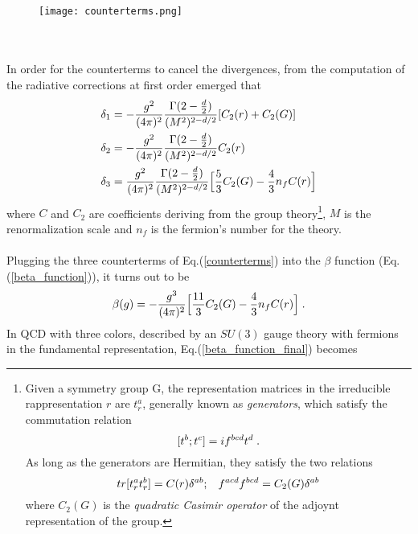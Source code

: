 \\\\
\phantom{i}
\begin{figure*}[h]
\centering
\texttt{[image: counterterms.png]}
\end{figure*}
\phantom{i}
\\\\
In order for the counterterms to cancel the divergences, from the computation of the radiative corrections at first order emerged that
\begin{align}
\begin{split}
\delta_1 &= - \frac{g^2}{(4\pi)^2}\frac{\Gamma(2-\frac{d}{2})}{(M^2)^{2-d/2}}[C_2(r)+C_2(G)] \\
\delta_2 &= - \frac{g^2}{(4\pi)^2}\frac{\Gamma(2-\frac{d}{2})}{(M^2)^{2-d/2}}C_2(r) \\
\delta_3 &= \frac{g^2}{(4\pi)^2}\frac{\Gamma(2-\frac{d}{2})}{(M^2)^{2-d/2}}\Bigl[\frac{5}{3}C_2(G)-\frac{4}{3}n_fC(r)\Bigr]
\end{split}
\label{counterterms}
\end{align}
where $C$ and $C_2$ are coefficients deriving from the group theory\footnote{Given a symmetry group G, the representation matrices in the irreducible rappresentation $r$ are $t_r^a$, generally known as \emph{generators}, which satisfy the commutation relation 
\begin{equation*}
\centering
[t^b;t^c]=if^{bcd}t^d \;.
\end{equation*}
As long as the generators are Hermitian, they satisfy the two relations
\begin{equation*}
tr[t_r^at_r^b] = C(r)\delta^{ab}; \hspace{0.3cm} f^{acd}f^{bcd} = C_2(G)\delta^{ab}
\end{equation*}
where $C_2(G)$ is the \emph{quadratic Casimir operator} of the adjoynt representation of the group.}, $M$ is the renormalization scale and $n_f$ is the fermion's number for the theory.
\\\\
Plugging the three counterterms of Eq.(\ref{counterterms}) into the $\beta$ function (Eq.(\ref{beta_function})), it turns out to be
\begin{equation}
\beta(g) = -\frac{g^3}{(4\pi)^2}\Bigl[\frac{11}{3}C_2(G)-\frac{4}{3}n_fC(r)\Bigr] \;.
\label{beta_function_final}
\end{equation}
In QCD with three colors, described by an $SU(3)$ gauge theory with fermions in the fundamental representation, Eq.(\ref{beta_function_final}) becomes
